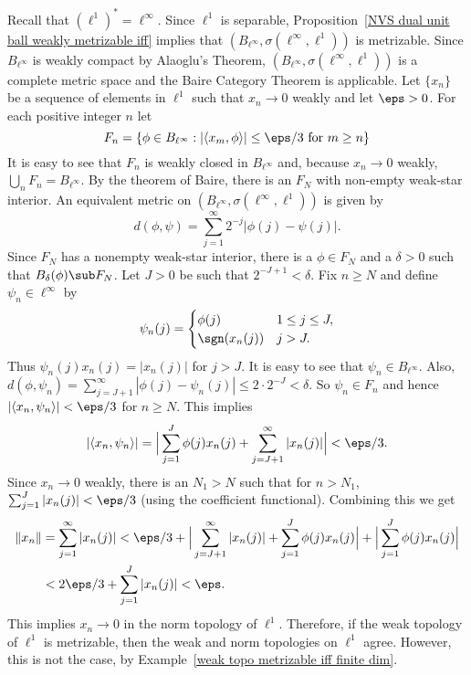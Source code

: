\begin{example}
Recall that $(\ell^1)^*=\ell^\infty$. Since $\ell^1$ is separable, Proposition~\ref{NVS dual unit ball weakly metrizable iff} implies that $(B_{\ell^\infty},\sigma(\ell^\infty,\ell^1))$ is metrizable. Since $B_{\ell^\infty}$ is weakly compact by Alaoglu's Theorem, $(B_{\ell^\infty},\sigma(\ell^\infty,\ell^1))$ is a complete metric space and the Baire Category Theorem is applicable. Let $\{x_n\}$ be a sequence of elements in $\ell^1$ such that $x_n\to 0$ weakly and let $\eps>0$. For each positive integer $n$ let
\[F_n=\{\phi\in B_{\ell^\infty}:|\langle x_m,\phi\rangle|\leq\eps/3\text{ for }m\geq n\}\]
It is easy to see that $F_n$ is weakly closed in $B_{\ell^\infty}$ and, because $x_n\to 0$ weakly, $\bigcup_nF_n=B_{\ell^\infty}$. By the theorem of Baire, there is an $F_N$ with non-empty weak-star interior. An equivalent metric on $(B_{\ell^\infty},\sigma(\ell^\infty,\ell^1))$ is given by
\[d(\phi,\psi)=\sum_{j=1}^{\infty}2^{-j}|\phi(j)-\psi(j)|.\]
Since $F_N$ has a nonempty weak-star interior, there is a $\phi\in F_N$ and a $\delta>0$ such that $B_{\delta}(\phi)\sub F_N$. Let $J>0$ be such that $2^{-J+1}<\delta$. Fix $n\geq N$ and define $\psi_n\in\ell^\infty$ by
\[\psi_n(j)=\begin{cases}
\phi(j)&1\leq j\leq J,\\
\sgn(x_n(j))&j>J.
\end{cases}\]
Thus $\psi_n(j)x_n(j)=|x_n(j)|$ for $j>J$. It is easy to see that $\psi_n\in B_{\ell^\infty}$. Also, $d(\phi,\psi_n)=\sum_{j=J+1}^{\infty}|\phi(j)-\psi_n(j)|\leq 2\cdot 2^{-J}<\delta$. So $\psi_n\in F_n$ and hence $|\langle x_n,\psi_n\rangle|<\eps/3$ for $n\geq N$. This implies
\[|\langle x_n,\psi_n\rangle|=\Big|\sum_{j=1}^{J}\phi(j)x_n(j)+\sum_{j=J+1}^{\infty}|x_n(j)|\Big|<\eps/3.\]
Since $x_n\to 0$ weakly, there is an $N_1>N$ such that for $n>N_1$, $\sum_{j=1}^{J}|x_n(j)|<\eps/3$ (using the coefficient functional). Combining this we get
\begin{align*}
\|x_n\|&=\sum_{j=1}^{\infty}|x_n(j)|<\eps/3+\Big|\sum_{j=J+1}^{\infty}|x_n(j)|+\sum_{j=1}^{J}\phi(j)x_n(j)\Big|+\Big|\sum_{j=1}^{J}\phi(j)x_n(j)\Big|\\
&<2\eps/3+\sum_{j=1}^{J}|x_n(j)|<\eps.
\end{align*}
This implies $x_n\to 0$ in the norm topology of $\ell^1$. Therefore, if the weak topology of $\ell^1$ is metrizable, then the weak and norm topologies on $\ell^1$ agree. However, this is not the case, by Example~\ref{weak topo metrizable iff finite dim}.
\end{example}
